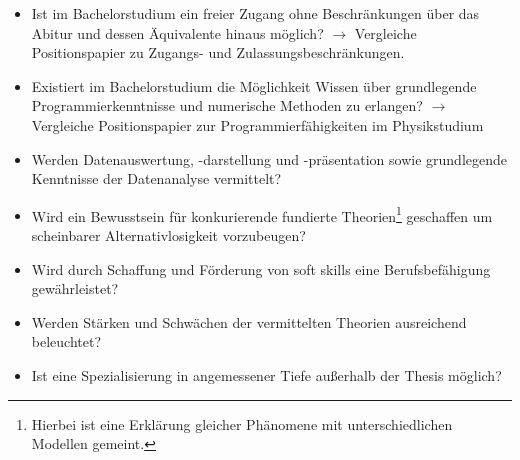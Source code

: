 \documentclass[DIV=calc]{scrartcl}
\begin{document}
	\begin{itemize}
		\item Ist im Bachelorstudium ein freier Zugang ohne
		Beschränkungen über das Abitur und dessen Äquivalente hinaus möglich?
		$\rightarrow$ Vergleiche Positionspapier zu Zugangs- und
		Zulassungsbeschränkungen.
		\item Existiert im Bachelorstudium die Möglichkeit Wissen
		über grundlegende Programmierkenntnisse und numerische Methoden zu
		erlangen? $\rightarrow$ Vergleiche Positionspapier zur
		Programmierfähigkeiten im
		Physikstudium
		\item Werden Datenauswertung, -darstellung und -präsentation sowie
		grundlegende Kenntnisse der Datenanalyse vermittelt?
		\item Wird ein Bewusstsein für konkurierende fundierte
		Theorien\footnote{Hierbei ist eine Erklärung gleicher
				Phänomene mit unterschiedlichen Modellen gemeint.} geschaffen um
		scheinbarer Alternativlosigkeit vorzubeugen?
		\item Wird durch Schaffung und Förderung von \glqq soft skills\grqq{}
		eine Berufsbefähigung gewährleistet?
	\end{itemize}

	\iffalse
	Hinweis @ASIIN: Im bisherigen Text derer Gutachterempfehlungen fehlt
	unseres Erachtens die Spezielle Relativitäts Theorie als Thema.
	\fi

	\begin{itemize}
		\item Werden Stärken und Schwächen der vermittelten Theorien ausreichend
		beleuchtet?
		\item Ist eine Spezialisierung in angemessener Tiefe außerhalb der
		Thesis möglich?
	\end{itemize}
\end{document}
